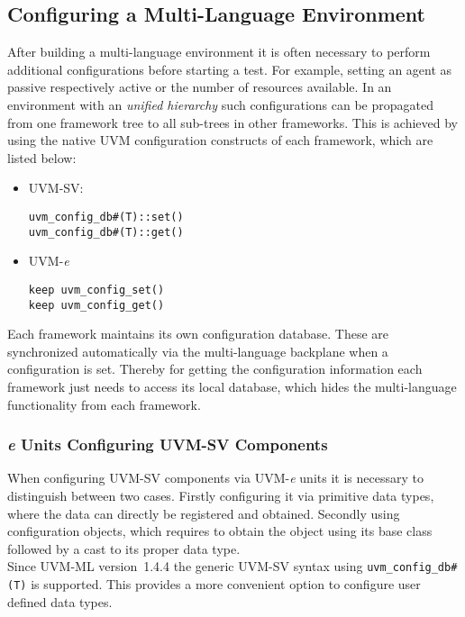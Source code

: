 \subsection{Configuring a Multi-Language Environment} \label{ml_config}
After building a multi-language environment it is often necessary to perform additional configurations before starting a
test. For example, setting an agent as passive respectively active or the number of resources available. In an
environment with an \emph{unified hierarchy} such configurations can be propagated from one framework tree
to all sub-trees in other frameworks. This is achieved by using the native UVM configuration constructs of each
framework, which are listed below:
\begin{itemize}
\item{UVM-SV:}
{}
\begin{lstlisting}
uvm_config_db#(T)::set()
uvm_config_db#(T)::get()
\end{lstlisting} 

\item{UVM-\textit{e}}
{}
\begin{lstlisting}
keep uvm_config_set()
keep uvm_config_get()
\end{lstlisting} 
\end{itemize}

Each framework maintains its own configuration database. These are synchronized automatically via the multi-language
backplane when a configuration is set. Thereby for getting the configuration information each framework just needs to
access its local database, which hides the multi-language functionality from each framework.

\subsubsection{\textit{e} Units Configuring UVM-SV Components}\label{e_config_sv}

When configuring UVM-SV components via UVM-\textit{e} units it is necessary to distinguish between two cases. Firstly
configuring it via primitive data types, where the data can directly be registered and obtained. Secondly using
configuration objects, which requires to obtain the object using its base class followed by a cast to its proper data
type.\\
Since UVM-ML version~1.4.4 the generic UVM-SV syntax using \lstinline$uvm_config_db#(T)$ is supported. This
provides a more convenient option to configure user defined data types. 

